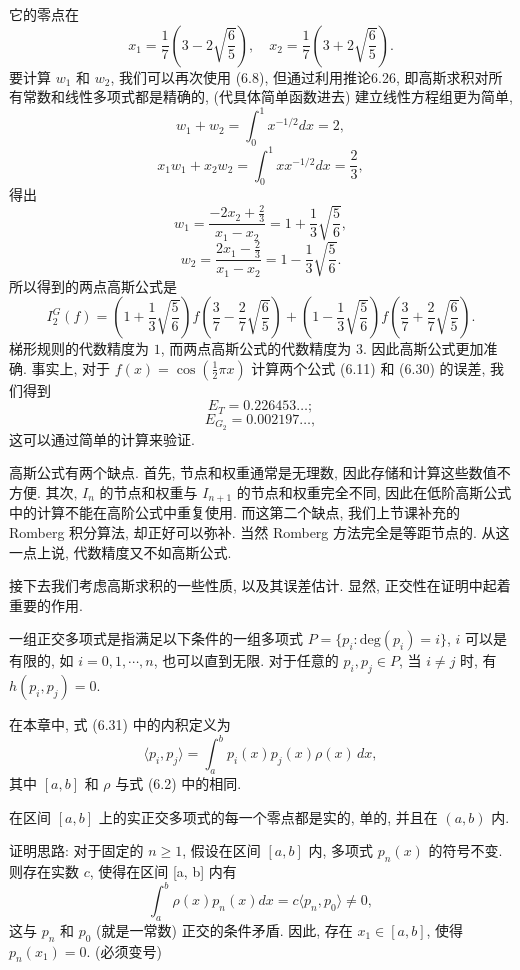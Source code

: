 \documentclass[a4paper]{ctexart}
\newcommand{\hl}[1]
{\noindent {\bf {#1}}}
\begin{document}
它的零点在
$$ 
x_1 = \frac{1}{7}\left(3 - 2\sqrt{\frac{6}{5}}\right), 
\quad x_2 = \frac{1}{7}\left(3 + 2\sqrt{\frac{6}{5}}\right). 
$$
要计算 $w_1$ 和 $w_2$, 我们可以再次使用 (6.8), 
但通过利用推论6.26, 即高斯求积对所有常数和线性多项式都是精确的, 
(代具体简单函数进去) 建立线性方程组更为简单, 
$$ 
w_1 + w_2 = \int_{0}^{1} x^{-1/2}dx = 2, 
$$
$$ 
x_1w_1 + x_2w_2 = \int_{0}^{1} xx^{-1/2}dx = \frac{2}{3}, 
$$
得出
$$ 
w_1 
= \frac{-2x_2 + \frac{2}{3}}{x_1 - x_2} 
= 1 + \frac{1}{3}\sqrt{\frac{5}{6}}, 
$$
$$ 
w_2 
= \frac{2x_1 - \frac{2}{3}}{x_1 - x_2} 
= 1 - \frac{1}{3}\sqrt{\frac{5}{6}}. 
$$
所以得到的两点高斯公式是
$$ 
I^G_2(f) 
= \left(1 + \frac{1}{3}\sqrt{\frac{5}{6}}\right)f\left(\frac{3}{7} 
- \frac{2}{7}\sqrt{\frac{6}{5}}\right) 
+ \left(1 - \frac{1}{3}\sqrt{\frac{5}{6}}\right)f\left(\frac{3}{7} 
+ \frac{2}{7}\sqrt{\frac{6}{5}}\right). 
$$ 
梯形规则的代数精度为 $1$, 而两点高斯公式的代数精度为 $3$. 
因此高斯公式更加准确. 
事实上, 对于 $f(x) = \cos\left(\frac{1}{2}\pi x\right)$ 计算两个公式 
(6.11) 和 (6.30) 的误差, 我们得到
$$ 
E_T = 0.226453\ldots; 
$$
$$ 
E_{G_2} = 0.002197\ldots, 
$$
这可以通过简单的计算来验证. 

高斯公式有两个缺点. 首先, 节点和权重通常是无理数, 因此存储和计算这些数值不方便. 其次, $I_n$ 
的节点和权重与 $I_{n+1}$ 的节点和权重完全不同, 因此在低阶高斯公式中的计算不能在高阶公式中重复使用.
而这第二个缺点, 我们上节课补充的 Romberg 积分算法, 却正好可以弥补. 当然 Romberg 方法完全是等距节点的. 
从这一点上说, 代数精度又不如高斯公式. 

接下去我们考虑高斯求积的一些性质, 以及其误差估计. 显然, 正交性在证明中起着重要的作用. 

\hl{定义 6.29} 一组正交多项式是指满足以下条件的一组多项式 
$P = \{p_i : \text{deg}(p_i) = i\}$, $i$ 可以是有限的, 如 $i = 0, 1, \cdots, n$, 也可以直到无限. 
对于任意的 $p_i, p_j \in P$, 当 $i \neq j$ 时, 有 $h(p_i, p_j) = 0$. 

\hl{例 6.30} 在本章中, 式 (6.31) 中的内积定义为
$$
\langle p_i, p_j\rangle = \int_{a}^{b} p_i(x) p_j(x) \rho(x) \, dx, 
$$
其中 $[a, b]$ 和 $\rho$ 与式 (6.2) 中的相同. 

\hl{定理 6.31} 在区间 $[a, b]$ 上的实正交多项式的每一个零点都是实的, 单的, 并且在 $(a, b)$ 内.

证明思路: 对于固定的 $n \geq 1$, 假设在区间 $[a, b]$ 内, 多项式 $p_n(x)$ 的符号不变. 
则存在实数 $c$, 使得在区间 [a, b] 内有
$$
\int_a^b \rho(x)p_n(x) dx = c \langle p_n, p_0 \rangle \neq 0,
$$
这与 $p_n$ 和 $p_0$ (就是一常数) 正交的条件矛盾. 因此, 存在 $x_1 \in [a, b]$, 使得 $p_n(x_1) = 0$.
(必须变号)
\end{document}
